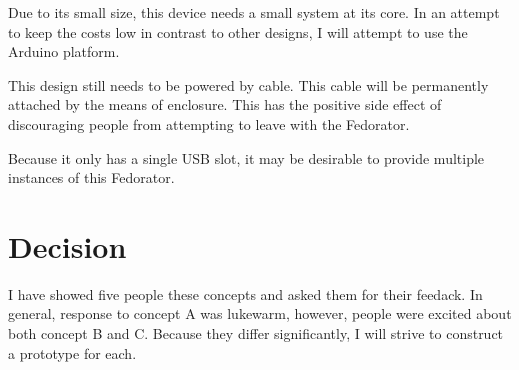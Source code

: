             Due to its small size, this device needs a small system at its core.  In an attempt to keep the costs low in contrast to other designs, I will attempt to use the Arduino platform.
            
            This design still needs to be powered by cable.  This cable will be permanently attached by the means of enclosure.  This has the positive side effect of discouraging people from attempting to leave with the Fedorator.
            
            Because it only has a single USB slot, it may be desirable to provide multiple instances of this Fedorator.
            \newpage
            
    \section{Decision}
        I have showed five people these concepts and asked them for their feedack.  In general, response to concept A was lukewarm, however, people were excited about both concept B and C.  Because they differ significantly, I will strive to construct a prototype for each.

